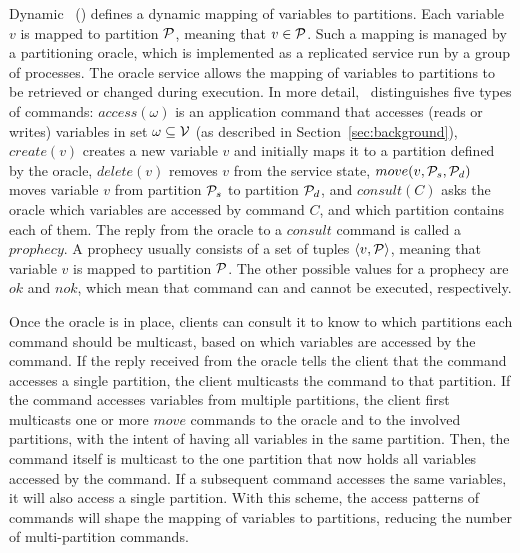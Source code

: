 Dynamic \ssmr\ (\dssmr) defines a dynamic mapping of variables to partitions.
Each variable $v$ is mapped to partition $\mathcal{P}$, meaning that $v \in \mathcal{P}$.
Such a mapping is managed by a partitioning oracle, which is implemented as a replicated service run by a group of processes.
The oracle service allows the mapping of variables to partitions to be retrieved or changed during execution.
In more detail, \dssmr\ distinguishes five types of commands:
$access(\omega)$ is an application command that accesses (reads or writes) variables in set $\omega \subseteq \mathcal{V}$ (as described in Section~\ref{sec:background}),
$create(v)$ creates a new variable $v$ and initially maps it to a partition defined by the oracle,
$delete(v)$ removes $v$ from the service state,
$move(v,\mathcal{P}_s,\mathcal{P}_d)$ moves variable $v$ from partition $\mathcal{P}_s$ to partition $\mathcal{P}_d$,
and $consult(C)$ asks the oracle which variables are accessed by command $C$, and which partition contains each of them.
The reply from the oracle to a $consult$ command is called a $prophecy$.
A prophecy usually consists of a set of tuples $\langle v, \mathcal{P} \rangle$, meaning that variable $v$ is mapped to partition $\mathcal{P}$.
The other possible values for a prophecy are $ok$ and $nok$, which mean that command can and cannot be executed, respectively.


Once the oracle is in place, clients can consult it to know to which partitions each command should be multicast, based on which variables are accessed by the command.
If the reply received from the oracle tells the client that the command accesses a single partition, the client multicasts the command to that partition.
If the command accesses variables from multiple partitions, the client first multicasts one or more $move$ commands to the oracle and to the involved partitions, with the intent of having all variables in the same partition.
Then, the command itself is multicast to the one partition that now holds all variables accessed by the command.
If a subsequent command accesses the same variables, it will also access a single partition.
With this scheme, the access patterns of commands will shape the mapping of variables to partitions, reducing the number of multi-partition commands.

